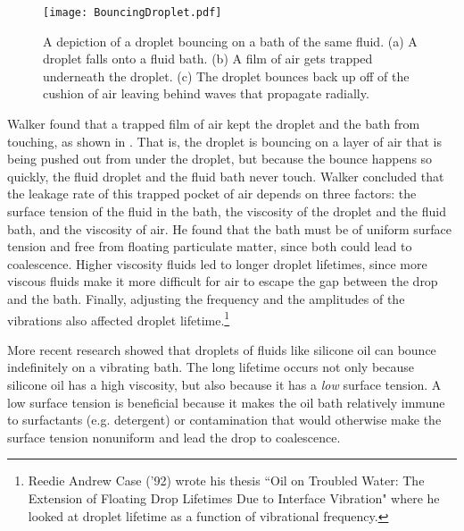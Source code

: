 \begin{figure}[h!]
	\centering
	\texttt{[image: BouncingDroplet.pdf]}
	\caption{A depiction of a droplet bouncing on a bath of the same fluid. (a) A droplet falls onto a fluid bath. (b) A film of air gets trapped underneath the droplet. (c) The droplet bounces back up off of the cushion of air leaving behind waves that propagate radially.}
	\label{bounce}
\end{figure}
	    
	    Walker found that a trapped film of air kept the droplet and the bath from touching, as shown in . That is, the droplet is bouncing on a layer of air that is being pushed out from under the droplet, but because the bounce happens so quickly, the fluid droplet and the fluid bath never touch. Walker concluded that the leakage rate of this trapped pocket of air depends on three factors: the surface tension of the fluid in the bath, the viscosity of the droplet and the fluid bath, and the viscosity of air. He found that the bath must be of uniform surface tension and free from floating particulate matter, since both could lead to coalescence. Higher viscosity fluids led to longer droplet lifetimes, since more viscous fluids make it more difficult for air to escape the gap between the drop and the bath. Finally, adjusting the frequency and the amplitudes of the vibrations also affected droplet lifetime.\footnote{Reedie Andrew Case ('92) wrote his thesis ``Oil on Troubled Water: The Extension of Floating Drop Lifetimes Due to Interface Vibration" where he looked at droplet lifetime as a function of vibrational frequency.}   
	     
	    More recent research showed that droplets of fluids like silicone oil can bounce indefinitely on a vibrating bath. The long lifetime occurs not only because silicone oil has a high viscosity, but also because it has a \textit{low} surface tension. A low surface tension is beneficial because it makes the oil bath relatively immune to surfactants (e.g. detergent) or contamination that would otherwise make the surface tension nonuniform and lead the drop to coalescence. 

